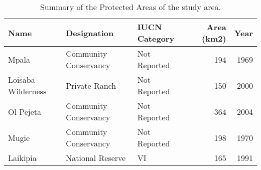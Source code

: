 \begin{table}[H]
\centering
\caption[Summary of the Protected Areas, Laikipia]{Summary of the Protected Areas of the study area.} 
\label{table:summary_wdpa_KEN}
\begin{tabular}{lllrr}
  \toprule
Name & Designation & IUCN Category & Area (km2) & Year \\ 
  \midrule
Mpala & Community Conservancy & Not Reported & 194 & 1969 \\ 
  Loisaba Wilderness & Private Ranch & Not Reported & 150 & 2000 \\ 
  Ol Pejeta & Community Conservancy & Not Reported & 364 & 2004 \\ 
  Mugie & Community Conservancy & Not Reported & 198 & 1970 \\ 
  Laikipia & National Reserve & VI & 165 & 1991 \\ 
   \bottomrule
\end{tabular}
\end{table}
